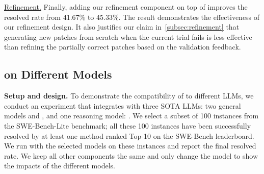 \underline{Refinement.}
Finally, adding our refinement component on top of  improves the resolved rate from 41.67\% to 45.33\%.
The result demonstrates the effectiveness of our refinement design. 
It also justifies our claim in~\cref{subsec:refinement} that generating new patches from scratch when the current trial fails is less effective than refining the partially correct patches based on the validation feedback. 

\subsection{\sys on Different Models}
\label{subsec:Model_test}


\noindent\textbf{Setup and design.}
To demonstrate the compatibility of \sys to different LLMs, we conduct an experiment that integrates \sys with three SOTA LLMs: two general models \gpt and \claude, and one reasoning model: \oo. 
We select a subset of 100 instances from the SWE-Bench-Lite benchmark; all these 100 instances have been successfully resolved by at least one method ranked Top-10 on the SWE-Bench leaderboard. 
We run \sys with the selected models on these instances and report the final resolved rate. 
We keep all other components the same and only change the model to show the impacts of the different models.


